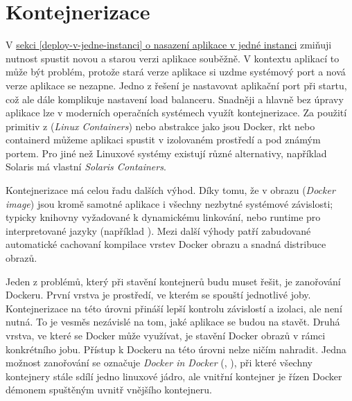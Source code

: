     \section{Kontejnerizace}
        V \hyperref[deploy-v-jedne-instanci]{sekci \ref*{deploy-v-jedne-instanci} o nasazení aplikace v jedné instanci} zmiňuji nutnost spustit novou a starou verzi aplikace souběžně. V kontextu \HTTP aplikací to může být problém, protože stará verze aplikace si uzdme systémový port a nová verze aplikace se nezapne. Jedno z řešení je nastavovat aplikační port při startu, což ale dále komplikuje nastavení load balanceru. Snadněji a hlavně bez úpravy aplikace lze v moderních operačních systémech využít kontejnerizace. Za použití primitiv z  (\textit{Linux Containers}) nebo abstrakce jako jsou Docker, rkt nebo containerd můžeme aplikaci spustit v izolovaném prostředí a pod známým portem. Pro jiné než Linuxové systémy existují různé alternativy, například Solaris má vlastní \textit{Solaris Containers}.

        Kontejnerizace má celou řadu dalších výhod. Díky tomu, že v obrazu (\textit{Docker image}) jsou kromě samotné aplikace i všechny nezbytné systémové závislosti; typicky knihovny vyžadované k dynamickému linkování, nebo runtime pro interpretované jazyky (například ). Mezi další výhody patří zabudované automatické cachovaní kompilace vrstev Docker obrazu a snadná distribuce obrazů.

        \label{sec:dind}
        Jeden z problémů, který při stavění kontejnerů budu muset řešit, je zanořování Dockeru. První vrstva je prostředí, ve kterém se spouští jednotlivé \CI joby. Kontejnerizace na této úrovni přináší lepší kontrolu závislostí a izolaci, ale není nutná. To je vesměs nezávislé na tom, jaké aplikace se budou na \CI stavět. Druhá vrstva, ve které se Docker může využívat, je stavění Docker obrazů v rámci konkrétního \CI jobu. Přístup k Dockeru na této úrovni nelze ničím nahradit. Jedna možnost zanořování se označuje \textit{Docker in Docker} (, ), při které všechny kontejnery stále sdílí jedno linuxové jádro, ale vnitřní kontejner je řízen Docker démonem spuštěným uvnitř vnějšího kontejneru.

